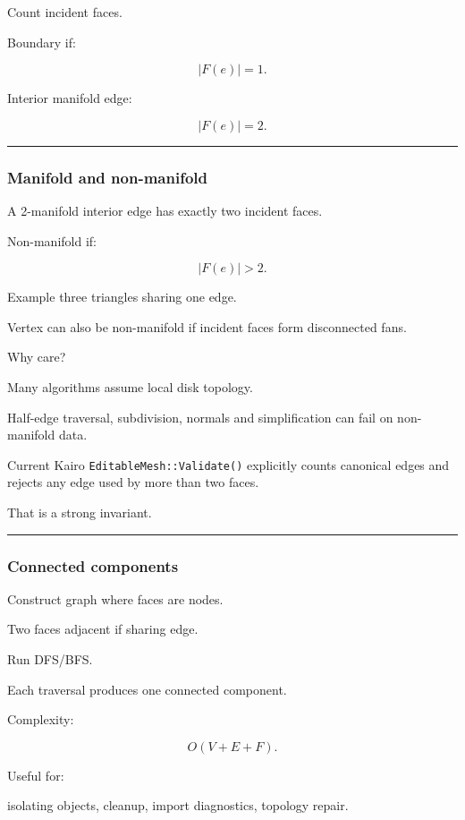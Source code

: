 Count incident faces.

Boundary if:

\[
\boxed{
|F(e)|=1.
}
\]

Interior manifold edge:

\[
|F(e)|=2.
\]

\begin{center}\rule{0.5\linewidth}{0.5pt}\end{center}

\subsubsection{Manifold and non-manifold}\label{manifold-and-non-manifold}

A 2-manifold interior edge has exactly two incident faces.

Non-manifold if:

\[
|F(e)|>2.
\]

Example three triangles sharing one edge.

Vertex can also be non-manifold if incident faces form disconnected fans.

Why care?

Many algorithms assume local disk topology.

Half-edge traversal, subdivision, normals and simplification can fail on non-manifold data.

Current Kairo \texttt{EditableMesh::Validate()} explicitly counts canonical edges and rejects any edge used by more than two faces.

That is a strong invariant.

\begin{center}\rule{0.5\linewidth}{0.5pt}\end{center}

\subsubsection{Connected components}\label{connected-components}

Construct graph where faces are nodes.

Two faces adjacent if sharing edge.

Run DFS/BFS.

Each traversal produces one connected component.

Complexity:

\[
O(V+E+F).
\]

Useful for:

isolating objects, cleanup, import diagnostics, topology repair.

